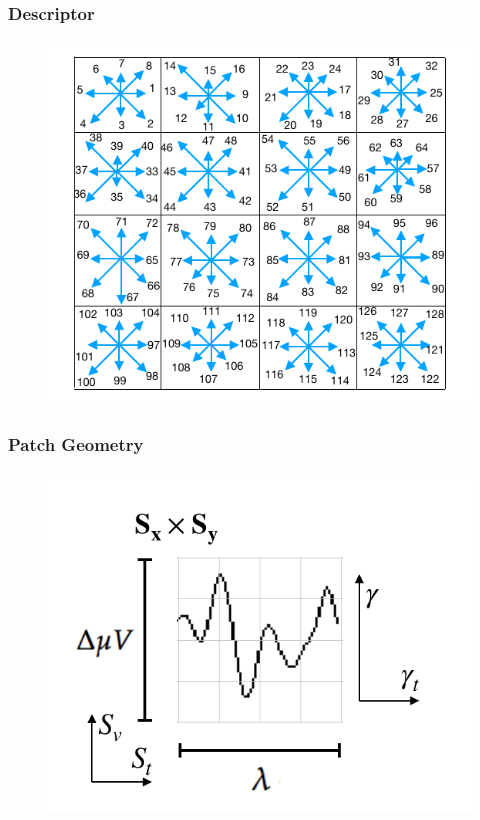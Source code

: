 \documentclass[aspectratio=169]{beamer}
\begin{document}
\begin{frame}
\frametitle{Descriptor}
\begin{center}
\begin{figure}[h!]
\centering
\includegraphics[scale=0.9]{images/gradientorientations.pdf}
\label{fig:orientationsfull}
\end{figure}
\end{center}
\end{frame}


\begin{frame}
\frametitle{Patch Geometry}
\begin{center}
\begin{figure}[h!]
\centering
\includegraphics[scale=0.9]{images/patchgeometry.pdf}
\label{fig:patchgeometry}
\end{figure}
\end{center}
\end{frame}
\end{document}
